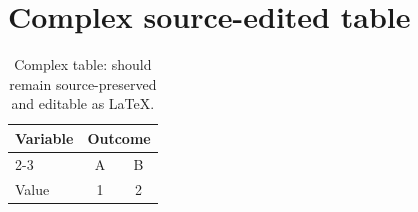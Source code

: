 \documentclass{article}
\begin{document}
\section{Complex source-edited table}

\begin{table}[htbp]
\centering
\begin{tabular}{lcc}
\toprule
Variable & \multicolumn{2}{c}{Outcome} \\
\cmidrule(lr){2-3}
 & A & B \\
Value & 1 & 2 \\
\bottomrule
\end{tabular}
\caption{Complex table: should remain source-preserved and editable as LaTeX.}
\label{tab:complex}
\end{table}
\end{document}
